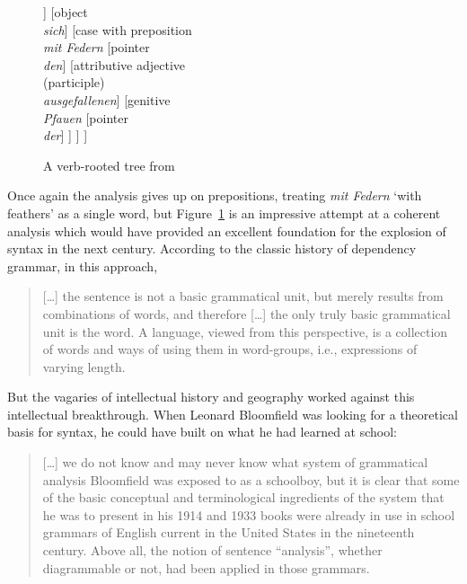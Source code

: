 \documentclass[output=paper
 	        ,biblatex
                ,babelshorthands
                ,newtxmath
                ,draftmode
                ,colorlinks, citecolor=brown
]{langscibook}
\begin{document}
\begin{figure}
	\centering
\begin{forest}
[finite verb\\\emph{schmückte}
	[subject word\\\emph{Krähe}
		[counter\\\emph{eine}]
		[attributive adjective\\\emph{stolze}]
	]
	[object\\\emph{sich}]
	[case with preposition\\\emph{mit Federn}
		[pointer\\\emph{den}]
		[attributive adjective\\(participle)\\\emph{ausgefallenen}]
		[genitive\\\emph{Pfauen}
			[pointer\\\emph{der}]
		]
	]
]
\end{forest}
\caption{A verb-rooted tree from \citet[]{Kern1884a-u}}
\label{fig:4}
\end{figure}


Once again the analysis gives up on prepositions, treating \emph{mit Federn} `with feathers' as a
single word, but Figure~\ref{fig:4} is an impressive attempt at a coherent analysis which would have
provided an excellent foundation for the explosion of syntax in the next century. According to the
classic history of dependency grammar, in this approach,

\begin{quotation} [\dots] the sentence is not a basic grammatical unit, but merely results from
  combinations of words, and therefore [\dots] the only truly basic grammatical unit is the word. A
  language, viewed from this perspective, is a collection of words and ways of using them in
  word-groups, i.e., expressions of varying length. \citep{Percival2007}
\end{quotation}

But the vagaries of intellectual history and geography worked against this intellectual
breakthrough. When Leonard Bloomfield was looking for a theoretical basis for syntax, he could have
built on what he had learned at school:

\begin{quotation} [\dots] we do not know and may never know what system of grammatical analysis
  Bloomfield was exposed to as a schoolboy, but it is clear that some of the basic conceptual and
  terminological ingredients of the system that he was to present in his 1914 and 1933 books were
  already in use in school grammars of English current in the United States in the nineteenth
  century. Above all, the notion of sentence ``analysis'', whether diagrammable or not, had been
  applied in those grammars. \citep{Percival2007}
\end{quotation}
\end{document}
